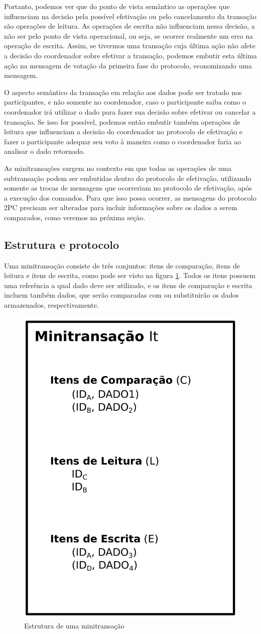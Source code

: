 \documentclass[11pt,twoside,a4paper]{book}
\begin{document}
Portanto, podemos ver que do ponto de vista semântico as operações que influenciam na decisão pela possível efetivação ou pelo cancelamento da transação são operações de leitura. As operações de escrita não influenciam nessa decisão, a não ser pelo ponto de vista operacional, ou seja, se ocorrer realmente um erro na operação de escrita. Assim, se tivermos uma transação cuja última ação não afete a decisão do coordenador sobre efetivar a transação, podemos embutir esta última ação na mensagem de votação da primeira fase do protocolo, economizando uma mensagem.

O aspecto semântico da transação em relação aos dados pode ser tratado nos participantes, e não somente no coordenador, caso o participante saiba como o coordenador irá utilizar o dado para fazer sua decisão sobre efetivar ou cancelar a transação. Se isso for possível, podemos então embutir também operações de leitura que influenciam a decisão do coordenador no protocolo de efetivação e fazer o participante adequar seu voto à maneira como o coordenador faria ao analisar o dado retornado.

As minitransações surgem no contexto em que todas as operações de uma subtransação podem ser embutidas dentro do protocolo de efetivação, utilizando somente as trocas de mensagens que ocorreriam no protocolo de efetivação, após a execução dos comandos. Para que isso possa ocorrer, as mensagens do protocolo 2PC precisam ser alteradas para incluir informações sobre os dados a serem comparados, como veremos na próxima seção.

\subsection{Estrutura e protocolo}
\label{subsec:estrutura-minitransacoes}
Uma minitransação consiste de três conjuntos: itens de comparação, itens de leitura e itens de escrita, como pode ser visto na figura \ref{fig:estrutura_minitransacao}. Todos os itens possuem uma referência a qual dado deve ser utilizado, e os itens de comparação e escrita incluem também dados, que serão comparadas com ou substituirão os dados armazenados, respectivamente. 

\begin{figure}
  \centering
  \includegraphics[width=.40\textwidth]{estrutura_minitransacao} 
  \caption{Estrutura de uma minitransação}
  \label{fig:estrutura_minitransacao} 
\end{figure}
\end{document}
